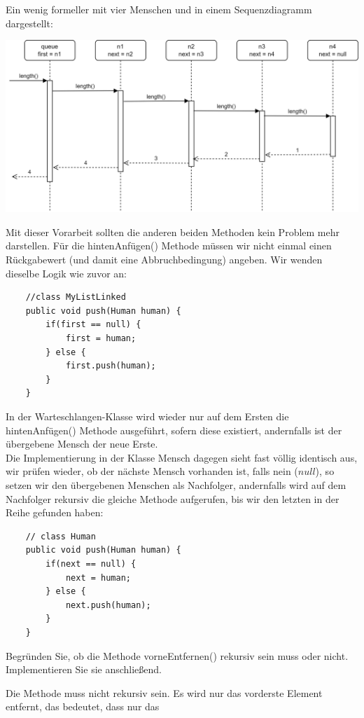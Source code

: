 \documentclass{article}
\begin{document}
Ein wenig formeller mit vier Menschen und in einem Sequenzdiagramm dargestellt:
\begin{center}
    \includegraphics[scale = 0.20]{../media/length_sequence.png}
\end{center}
Mit dieser Vorarbeit sollten die anderen beiden Methoden kein Problem mehr darstellen. Für die hintenAnfügen() Methode 
müssen wir nicht einmal einen Rückgabewert (und damit eine Abbruchbedingung) angeben. Wir wenden dieselbe Logik wie zuvor an:
\begin{verbatim}
    //class MyListLinked
    public void push(Human human) {
        if(first == null) {
            first = human;
        } else {
            first.push(human);
        }
    }
\end{verbatim}
In der Warteschlangen-Klasse wird wieder nur auf dem Ersten die hintenAnfügen() Methode ausgeführt, sofern diese 
existiert, andernfalls ist der übergebene Mensch der neue Erste. \\
Die Implementierung in der Klasse Mensch dagegen sieht fast völlig identisch aus, wir prüfen wieder, ob der nächste 
Mensch vorhanden ist, falls nein ($null$), so setzen wir den übergebenen Menschen als Nachfolger, andernfalls 
wird auf dem Nachfolger rekursiv die gleiche Methode aufgerufen, bis wir den letzten in der Reihe gefunden haben:
\begin{verbatim}
    // class Human
    public void push(Human human) {
        if(next == null) {
            next = human;
        } else {
            next.push(human);
        }
    }
\end{verbatim}
\begin{task}{1}
    Begründen Sie, ob die Methode vorneEntfernen() rekursiv sein muss oder nicht. Implementieren Sie sie anschließend.
\end{task}
Die Methode muss nicht rekursiv sein. Es wird nur das vorderste Element entfernt, das bedeutet, dass nur das 
\end{document}
